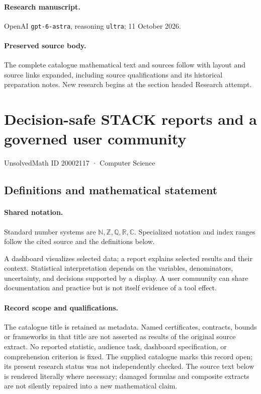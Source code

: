 \documentclass[11pt]{article}
\begin{document}
\paragraph{Research manuscript.} OpenAI \texttt{gpt-6-astra}, reasoning \texttt{ultra}; 11 October 2026.
\paragraph{Preserved source body.} The complete catalogue mathematical text and sources follow with layout and source links expanded, including source qualifications and its historical preparation notes. New research begins at the section headed Research attempt.

\section{Decision-safe STACK reports and a governed user community}\label{20002117}
{\small UnsolvedMath ID 20002117 · Computer Science}
\subsection{Definitions and mathematical statement}

\paragraph{Shared notation.}Standard number systems are $\mathbb N,\mathbb Z,\mathbb Q,\mathbb R,\mathbb C$. Specialized notation and index ranges follow the cited source and the definitions below.


A dashboard visualizes selected data; a report explains selected results and their context. Statistical interpretation depends on the variables, denominators, uncertainty, and decisions supported by a display. A user community can share documentation and practice but is not itself evidence of a tool effect.
\paragraph{Record scope and qualifications.}
The catalogue title is retained as metadata. Named certificates, contracts, bounds or frameworks in that title are not asserted as results of the original source extract.
No reported statistic, audience task, dashboard specification, or comprehension criterion is fixed. The supplied catalogue marks this record open; its present research status was not independently checked.
The source text below is rendered literally where necessary; damaged formulas and composite extracts are not silently repaired into a new mathematical claim.
\end{document}
